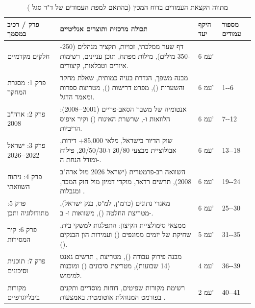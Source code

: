 \begin{table}[htbp]
\centering
\caption{מתווה הקצאת העמודים בדוח המכין (בהתאם למפת העמודים של ד"ר סגל \cite{segal2026prep})}
\label{tab:ch01_page_budget}
\small
\begin{tabularx}{\textwidth}{R{3.3cm} Y C{1.6cm} C{2.2cm}}
\toprule
{}
\textbf{פרק / רכיב במסמך} & \textbf{תכולה מרכזית ותוצרים אנליטיים} & \textbf{היקף יעד} & \textbf{מספור עמודים} \\
\midrule
חלקים מקדמיים & דף שער ממלכתי, זכויות, תקציר מנהלים (\num{250--350} מילים), מילות מפתח, תוכן עניינים, רשימות איורים וטבלאות, קיצורים. & \num{6} עמ' &  \\
\addlinespace[2pt]
פרק \num{1}: מסגרת המחקר & מבנה משפך, הגדרת בעיה כמותית, שאלת מחקר והשערות (), מפרט דרישות (), מטריצת ספרות ומאמר הדגל. & \num{6} עמ' & \num{1--6} \\
\addlinespace[2pt]
פרק \num{2}: ארה"ב \num{2008} & אנטומיה של משבר הסאב-פריים (\num{2001--2008}): הלוואות  ו-, שרשרת האיגוח () וקיר איפוס הריביות. & \num{6} עמ' & \num{7--12} \\
\addlinespace[2pt]
פרק \num{3}: ישראל \num{2022--2026} & שוק הדיור בישראל, מלאי \num{85,000+} דירות, אבולוציית מבצעי \num{20/80} ו-\num{20/50/30}, פילוח  ומודל הנחת ה-. & \num{6} עמ' & \num{13--18} \\
\addlinespace[2pt]
פרק \num{4}: ניתוח השוואתי & השוואה רב-פרמטרית (ישראל \num{2026} מול ארה"ב \num{2008}), תרשים רדאר, מוקדי דמיון מול חוק המכר,  ומגבלות . & \num{6} עמ' & \num{19--24} \\
\addlinespace[2pt]
פרק \num{5}: מתודולוגיה ותכן & מאגרי נתונים (כרמ"ן, למ"ס, בנק ישראל), מטריצת החלטה (), משוואות  ו- ב-. & \num{6} עמ' & \num{25--30} \\
\addlinespace[2pt]
פרק \num{6}: קיר המסירות & ממצאי סימולציית הקיצון: התפלגות  למשקי בית, שחיקת  של יזמים ממונפים () ועמידות הון הבנקים (). & \num{5} עמ' & \num{31--35} \\
\addlinespace[2pt]
פרק \num{7}: תוכנית וסיכונים & מבנה פירוק עבודה (), מטריצת , תרשים גאנט (\num{14} שבועות), מטריצת סיכונים () ומוכנות למימוש. & \num{4} עמ' & \num{36--39} \\
\addlinespace[2pt]
מקורות ביבליוגרפיים & רשימת מקורות שפיטים, דוחות מוסדיים ותקנים בפורמט  המנוהלת אוטומטית באמצעות . & \num{2} עמ' & \num{40--41} \\
\bottomrule
\end{tabularx}
\end{table}

